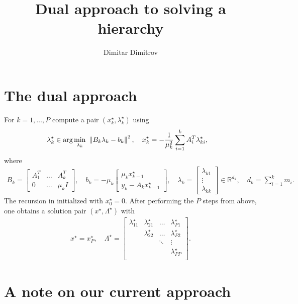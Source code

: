 \documentclass[12pt]{article}
\title{Dual approach to solving a hierarchy} \author{Dimitar Dimitrov}
\begin{document}
\maketitle

\section{The dual approach}

For $k=1,\dots,P$ compute a pair $(x_k^{\star},\lambda_{k}^{\star})$ using
%
\begin{align}
\lambda_k^{\star} \in \mbox{arg} \min_{\lambda_{k}} \  & \left\lVert B_k\lambda_{k} - b_k\right\rVert^2, \quad
x_k^{\star} = -\frac{1}{\mu_k^2}\sum_{i=1}^{k}A_i^T\lambda_{ki}^{\star},
\end{align}
%
where
%
\begin{align*}
B_k = \begin{bmatrix}A_1^T & \dots & A_k^T \\ 0 & \dots & \mu_kI \end{bmatrix}, \quad
b_k = -\mu_k\begin{bmatrix} \mu_k x_{k-1}^{\star} \\ y_k - A_kx_{k-1}^{\star} \end{bmatrix}, \quad
\lambda_{k} = \begin{bmatrix} \lambda_{k1} \\ \vdots \\ \lambda_{kk} \end{bmatrix} \in \mathbb{R}^{d_k}, \quad
d_k = \sum_{i=1}^{k}m_i.
\end{align*}
%
The recursion in initialized with $x_0^{\star} = 0$. After performing the $P$ steps from above, one
obtains a solution pair $(x^{\star}, \Lambda^{\star})$ with
%
\begin{align}
x^{\star} = x_P^{\star}, \quad
\Lambda^{\star} =
\begin{bmatrix}
  \lambda_{11}^{\star} & \lambda_{21}^{\star} & \dots  &\lambda_{P1}^{\star} \\
                       & \lambda_{22}^{\star} & \dots  &\lambda_{P2}^{\star} \\
                       &                      & \ddots & \vdots \\
                       &                      &        &\lambda_{PP}^{\star} \\
\end{bmatrix}.
\end{align}

\section{A note on our current approach}
\end{document}
